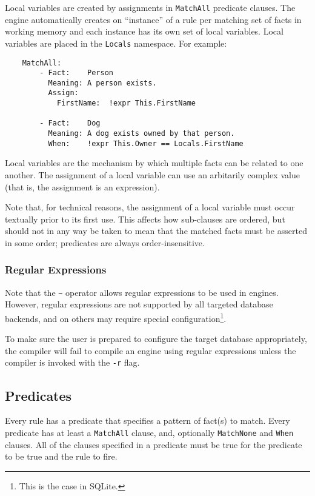 \documentclass[letterpaper,10pt]{article}
\begin{document}
Local variables are created by assignments in \texttt{MatchAll} predicate clauses.
The engine automatically creates on ``instance'' of a rule per matching set of facts in working memory and each instance has its own set of local variables.
Local variables are placed in the \texttt{Locals} namespace.
For example:
\begin{lstlisting}
    MatchAll:
        - Fact:    Person
          Meaning: A person exists.
          Assign:
            FirstName:  !expr This.FirstName

        - Fact:    Dog
          Meaning: A dog exists owned by that person.
          When:    !expr This.Owner == Locals.FirstName
\end{lstlisting}

Local variables are the mechanism by which multiple facts can be related to one another.
The assignment of a local variable can use an arbitarily complex value (that is, the assignment is an expression).

Note that, for technical reasons, the assignment of a local variable must occur textually prior to its first use.
This affects how sub-clauses are ordered, but should not in any way be taken to mean that the matched facts must be asserted in some order; predicates are always order-insensitive.

\subsubsection{Regular Expressions}
\label{regexp}
Note that the \texttt{\~} operator allows regular expressions to be used in engines.
However, regular expressions are not supported by all targeted database backends, and on others may require special configuration\footnote{This is the case in SQLite.}.

To make sure the user is prepared to configure the target database appropriately, the compiler will fail to compile an engine using regular expressions unless the compiler is invoked with the \texttt{-r} flag.

\subsection{Predicates}
\label{predicates}
Every rule has a predicate that specifies a pattern of fact(s) to match.
Every predicate has at least a \texttt{MatchAll} clause, and, optionally \texttt{MatchNone} and \texttt{When} clauses.
All of the clauses specified in a predicate must be true for the predicate to be true and the rule to fire.
\end{document}
